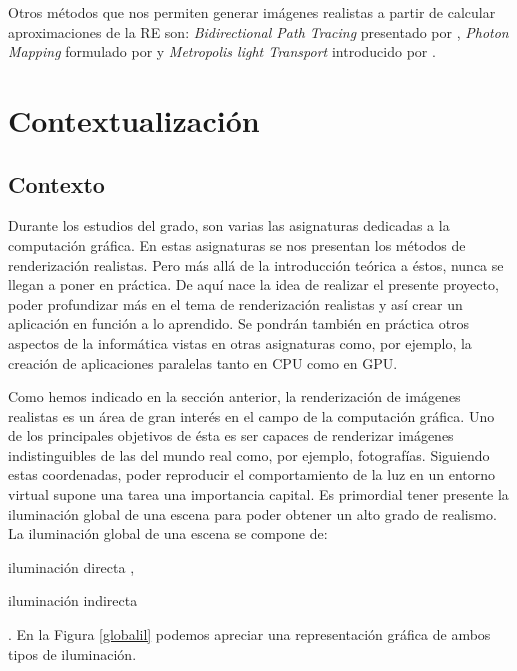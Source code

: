 \documentclass[titlepage,12pt]{report}
\begin{document}
Otros métodos que nos permiten generar imágenes realistas a partir de calcular aproximaciones de la RE son: \textit{Bidirectional Path Tracing} presentado por \citep{Lafortune1993}, \textit{Photon Mapping} formulado por \citep{Jensen1996} y \textit{Metropolis light Transport} introducido por \citep{Veach1997}.

\section{Contextualización}

\subsection{Contexto} \label{ref:contexto}

Durante los estudios del grado, son varias las asignaturas dedicadas a la computación gráfica. En estas asignaturas se nos presentan los métodos de renderización realistas. Pero más allá de la introducción teórica a éstos, nunca se llegan a poner en práctica. De aquí nace la idea de realizar el presente proyecto, poder profundizar más en el tema de renderización realistas y así crear un aplicación en función a lo aprendido. Se pondrán también en práctica otros aspectos de la informática vistas en otras asignaturas como, por ejemplo, la creación de aplicaciones paralelas tanto en CPU como en GPU.

Como hemos indicado en la sección anterior, la renderización de imágenes realistas es un área de gran interés en el campo de la computación gráfica. Uno de los principales objetivos de ésta es ser capaces de renderizar imágenes indistinguibles de las del mundo real como, por ejemplo, fotografías. Siguiendo estas coordenadas, poder reproducir el comportamiento de la luz en un entorno virtual supone una tarea una importancia capital. Es primordial tener presente la iluminación global de una escena para poder obtener un alto grado de realismo. La iluminación global de una escena se compone de: \begin{enumerate*}[label=\roman*)] \item iluminación directa \label{item:dl}, \item iluminación indirecta \label{item:il} \end{enumerate*}. En la Figura \ref{globalil} podemos apreciar una representación gráfica de ambos tipos de iluminación.
\end{document}
